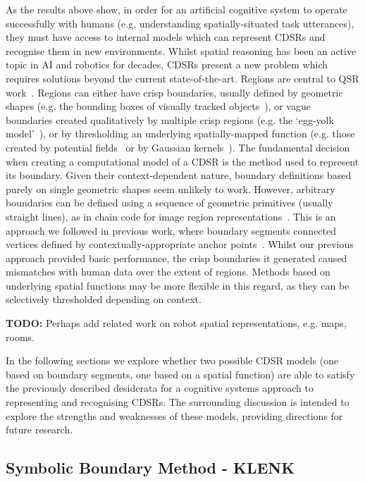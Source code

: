 \documentclass[11pt,letterpaper]{article}
\begin{document}
As the results above show, in order for an artificial cognitive system to operate successfully with humans (e.g. understanding spatially-situated task utterances), they must have access to internal models which can represent CDSRs and recognise them in new environments. Whilst spatial reasoning has been an active topic in AI and robotics for decades, CDSRs present a new problem which requires solutions beyond the current state-of-the-art. Regions are central to QSR work~\cite{Cohn:2001}. Regions can either have crisp boundaries, usually defined by geometric shapes (e.g. the bounding boxes of visually tracked objects~\cite{SridharCohn:10}), or vague boundaries created qualitatively by multiple crisp regions (e.g. the `egg-yolk model'~\cite{Cohn96b}), or by thresholding an underlying spatially-mapped function (e.g. those created by potential fields~\cite{brenneretal07ijcai} or by Gaussian kernels~\cite{burbridge-dearden12}). The fundamental decision when creating a computational model of a CDSR is the method used to represent its boundary. Given their context-dependent nature, boundary definitions based purely on single geometric shapes seem unlikely to work. However, arbitrary boundaries can be defined using a sequence of geometric primitives (usually straight lines), as in chain code for image region representations~\cite{Freeman:1961}. This is an approach we followed in previous work, where boundary segments connected vertices defined by contextually-appropriate anchor points~\cite{Hawes:2012}.  Whilst our previous approach provided basic performance, the crisp boundaries it generated caused mismatches with human data over the extent of regions. Methods based on underlying spatial functions may be more flexible in this regard, as they can be selectively thresholded depending on context. 


\textbf{TODO:} Perhaps add related work on robot spatial representations, e.g. maps, rooms.  

In the following sections we explore whether two possible CDSR models (one based on boundary segments, one based on a spatial function) are able to satisfy the previously described desiderata for a cognitive systems approach to representing and recognising CDSRs. The surrounding discussion is intended to explore the strengths and weaknesses of these models, providing directions for future research.

\subsection{Symbolic Boundary Method - KLENK}
\end{document}
